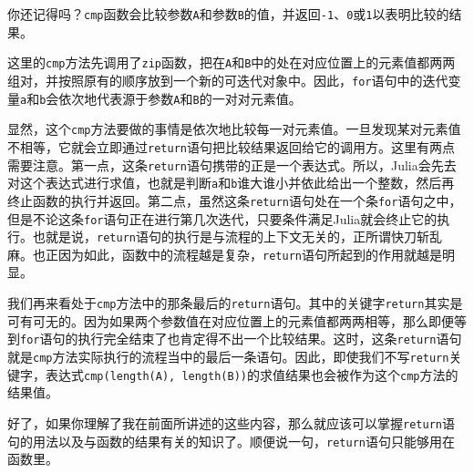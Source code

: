 你还记得吗？\verb|cmp|函数会比较参数\verb|A|和参数\verb|B|的值，并返回\verb|-1|、\verb|0|或\verb|1|以表明比较的结果。

这里的\verb|cmp|方法先调用了\verb|zip|函数，把在\verb|A|和\verb|B|中的处在对应位置上的元素值都两两组对，并按照原有的顺序放到一个新的可迭代对象中。因此，\verb|for|语句中的迭代变量\verb|a|和\verb|b|会依次地代表源于参数\verb|A|和\verb|B|的一对对元素值。

显然，这个\verb|cmp|方法要做的事情是依次地比较每一对元素值。一旦发现某对元素值不相等，它就会立即通过\verb|return|语句把比较结果返回给它的调用方。这里有两点需要注意。第一点，这条\verb|return|语句携带的正是一个表达式。所以，Julia会先去对这个表达式进行求值，也就是判断\verb|a|和\verb|b|谁大谁小并依此给出一个整数，然后再终止函数的执行并返回。第二点，虽然这条\verb|return|语句处在一个条\verb|for|语句之中，但是不论这条\verb|for|语句正在进行第几次迭代，只要条件满足Julia就会终止它的执行。也就是说，\verb|return|语句的执行是与流程的上下文无关的，正所谓快刀斩乱麻。也正因为如此，函数中的流程越是复杂，\verb|return|语句所起到的作用就越是明显。

我们再来看处于\verb|cmp|方法中的那条最后的\verb|return|语句。其中的关键字\verb|return|其实是可有可无的。因为如果两个参数值在对应位置上的元素值都两两相等，那么即便等到\verb|for|语句的执行完全结束了也肯定得不出一个比较结果。这时，这条\verb|return|语句就是\verb|cmp|方法实际执行的流程当中的最后一条语句。因此，即使我们不写\verb|return|关键字，表达式\verb|cmp(length(A), length(B))|的求值结果也会被作为这个\verb|cmp|方法的结果值。

好了，如果你理解了我在前面所讲述的这些内容，那么就应该可以掌握\verb|return|语句的用法以及与函数的结果有关的知识了。顺便说一句，\verb|return|语句只能够用在函数里。